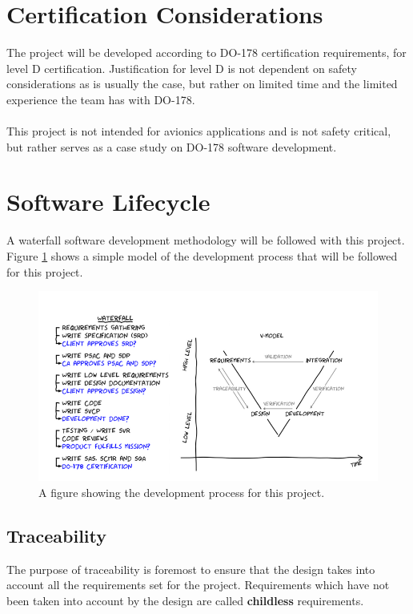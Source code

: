 \documentclass[11pt]{article}
\begin{document}
\section{Certification Considerations}
The project will be developed according to DO-178 certification requirements, for level D certification. Justification for level D is not dependent on safety considerations as is usually the case, but rather on limited time and the limited experience the team has with DO-178. \\ \\
This project is not intended for avionics applications and is not safety critical, but rather serves as a case study on DO-178 software development.

\section{Software Lifecycle}\label{sec:soft-life}
A waterfall software development methodology will be followed with this project. Figure \ref{figure-waterfall} shows a simple model of the development process that will be followed for this project.

\begin{figure}[H]
\centering
\includegraphics[width=4.5in]{./images/waterfall_model.png}
\caption[Waterfall Model]{A figure showing the development process for this project.}
\label{figure-waterfall}
\end{figure}

\subsection{Traceability}
The purpose of traceability is foremost to ensure that the design takes into account all the requirements set for the project. Requirements which have not been taken into account by the design are called \textbf{childless} requirements.\\
\end{document}
